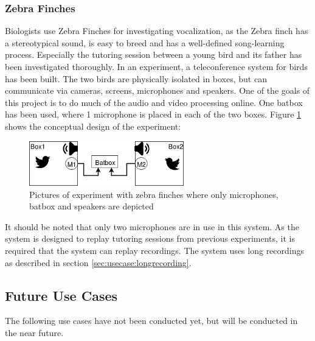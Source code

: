 \subsubsection{Zebra Finches} \label{sec:usecase:zebrafinches}
Biologists use Zebra Finches for investigating vocalization, as the Zebra finch has a stereotypical sound, is easy to breed and has a well-defined song-learning process. Especially the tutoring session between a young bird and its father has been investigated thoroughly. In an experiment, a teleconference system for birds has been built. The two birds are physically isolated in boxes, but can communicate via cameras, screens, microphones and speakers. One of the goals of this project is to do much of the audio and video processing online. One batbox has been used, where 1 microphone is placed in each of the two boxes.\citep{larsen2016system}
Figure \ref{fig:usecases:zebra:overview} shows the conceptual design of the experiment:

\begin{figure}[h!]
	\centering
	\includegraphics[width=0.6\textwidth]{figures/zebrafinches_experiment1.png}
	\caption{Pictures of experiment with zebra finches where only microphones, batbox and speakers are depicted}\label{fig:usecases:zebra:overview}
\end{figure}
It should be noted that only two microphones are in use in this system.
As the system is designed to replay tutoring sessions from previous experiments, it is required that the system can replay recordings.
The system uses long recordings as described in section \ref{sec:usecase:longrecording}.


\subsection{Future Use Cases}
The following use cases have not been conducted yet, but will be conducted in the near future.

